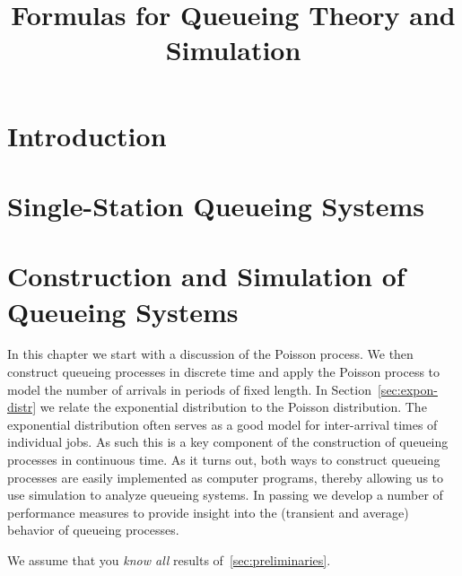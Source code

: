 \documentclass{book}
\title{Formulas for Queueing Theory and Simulation}
\begin{document}
\frontmatter
\maketitle


\tableofcontents


\chapter{Introduction}\label{sec:introduction}

%
%
%

\mainmatter
\chapter{Single-Station Queueing Systems}

\chapter{Construction and Simulation of Queueing Systems}
\label{cha:single-stat-queu}

In this chapter we start with a discussion of the Poisson process.
We then construct queueing processes in discrete time and apply the Poisson process to model the number of arrivals in periods of fixed length.
In Section~\ref{sec:expon-distr} we relate the exponential distribution to the Poisson distribution.
The exponential distribution often serves as a good model for inter-arrival times of individual jobs.
As such this is a key component of the construction of queueing processes in continuous time.
As it turns out, both ways to construct queueing processes are easily implemented as computer programs, thereby allowing us to use simulation to analyze queueing systems.
In passing we develop a number of performance measures to provide insight into the (transient and average) behavior of queueing processes.

We assume that you  \emph{know all} results of~\cref{sec:preliminaries}. 

%
\end{document}
